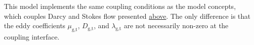 
This model implements the same coupling conditions as the model
concepts, which couples Darcy and Stokes flow presented \hyperref[sc_2cnistokes2p2cni]{above}.
The only difference is that the eddy coefficients $\mu_\textrm{g,t}$,
$D_\textrm{g,t}$, and $\lambda_\textrm{g,t}$ are not necessarily non-zero
at the coupling interface.
